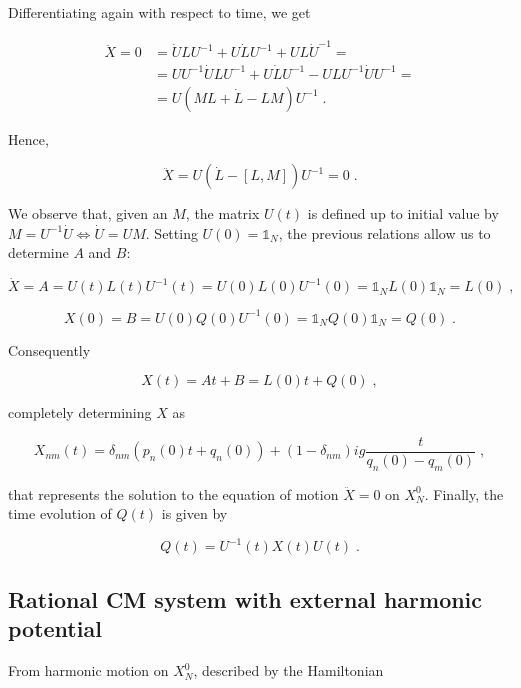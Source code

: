 Differentiating again with respect to time, we get

\begin{equation*}
\begin{split}
\ddot X = 0 &= \dot ULU^{-1} + U\dot L U^{-1} + UL\dot U^{-1} =\\
 &= UU^{-1}\dot ULU^{-1} + U\dot L U^{-1} - ULU^{-1}\dot U U^{-1} =\\
&= U(ML + \dot L- LM)U^{-1}\;.
\end{split}
\end{equation*}

Hence, 

\begin{equation}
    \ddot X = U(\dot L - [L,M])U^{-1} = 0\;.
\end{equation}

We observe that, given an $M$, the matrix $U(t)$ is defined up to initial value by $M = U^{-1}\dot U \iff \dot U = UM$. Setting $U(0) = \mathbb{1}_N$, the previous relations allow us to determine $A$ and $B$:

\begin{equation}
    \dot X = A = U(t)L(t)U^{-1}(t) = U(0)L(0)U^{-1}(0) = \mathbb{1}_N L(0) \mathbb{1}_N = L(0)\;,
\end{equation}

\begin{equation}
    X(0) = B = U(0)Q(0)U^{-1}(0) = \mathbb{1}_N Q(0) \mathbb{1}_N = Q(0)\;.
\end{equation}

Consequently

\begin{equation}
    X(t) = At + B = L(0)t + Q(0)\;,
\end{equation}

completely determining $X$ as

\begin{equation}
    X_{nm} (t) = \delta_{nm} (p_n(0)t + q_n(0)) + (1 - \delta_{nm}) ig \frac{t}{q_n(0) - q_m(0)}\;,
\end{equation}

that represents the solution to the equation of motion $\ddot X = 0$ on $X^0_N$. Finally, the time evolution of $Q(t)$ is given by

\begin{equation}
    Q(t) = U^{-1}(t) X(t) U(t)\;.
\end{equation}

\subsection{Rational CM system with external harmonic potential}
From harmonic motion on $X^0_N$, described by the Hamiltonian

